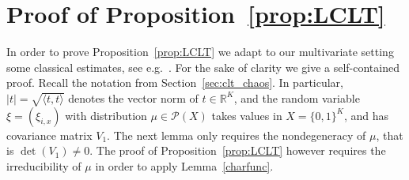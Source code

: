 \documentclass[AHL,Unicode,longabstracts,published]{cedram}
\newcommand{\scalar}[2]{\langle #1, #2\rangle}
\newcommand{\cP}{\mathcal{P}}
\newcommand{\bbR}{\mathbb{R}}
\begin{document}
\appendix



\section{Proof of Proposition~\ref{prop:LCLT}}

In order to prove Proposition~\ref{prop:LCLT} we adapt to our multivariate setting some classical estimates, see e.g.~\cite{Chung,Petrov}. For the sake of clarity we give a self-contained proof. Recall the notation from Section~\ref{sec:clt_chaos}. In particular, $|t|=\sqrt{\scalar{t}{t}}$ denotes the vector norm of $t\in\bbR^K$, and the random variable $\xi=(\xi_{i,x})$ with distribution $\mu\in\cP(X)$ takes values in $X=\{0,1\}^K$, and has covariance matrix $V_1$. The next lemma only requires the nondegeneracy of $\mu$, that is $\det(V_1)\neq 0$. The proof of Proposition~\ref{prop:LCLT} however requires the irreducibility of $\mu$ in order to apply Lemma~\ref{charfunc}.
\end{document}
